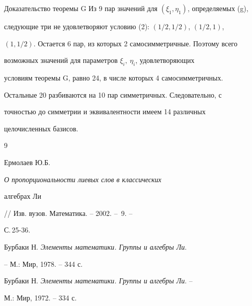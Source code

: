 \begin{pf*}{Доказательство теоремы G}
Из 9 пар значений для $(\xi_1,\eta_1)$, определяемых (g),


следующие три не удовлетворяют условию (2): $(1/2,1/2)$, $(1/2,1)$,


$(1,1/2)$. Остается 6 пар, из которых 2 самосимметричные. Поэтому всего


возможных значений для параметров $\xi_i,\ \eta_i$, удовлетворяющих


условиям теоремы G, равно 24, в числе которых 4 самосимметричных.


Остальные 20 разбиваются на 10 пар симметричных. Следовательно, с


точностью до симметрии и эквивалентности имеем 14 различных


целочисленных базисов.


\end{pf*}








\begin{thebibliography}{9}







Ермолаев Ю.Б. {\em О пропорциональности лиевых слов в классических


алгебрах Ли} // Изв. вузов. Математика. -- 2002. -- \No\,9. --


С.\,25-36.




Бурбаки Н. {\em Элементы математики. Группы и алгебры Ли}.


-- М.: Мир, 1978. -- 344 с.




Бурбаки Н. {\em Элементы математики. Группы и алгебры Ли}. --


М.: Мир, 1972. -- 334 с.


\end{thebibliography}





\vskip 2cm












\label{end}









